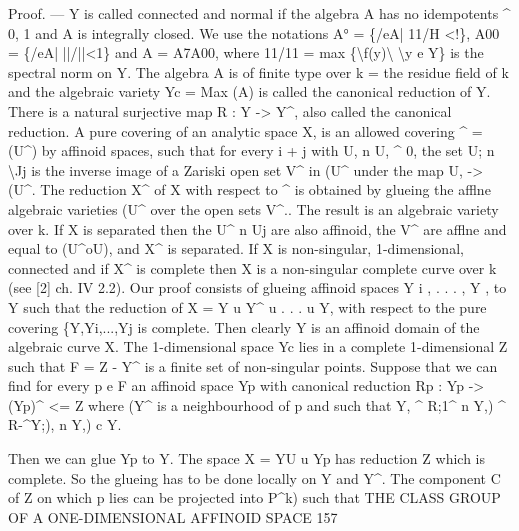 \documentclass[
  10pt,
]{article}
\newenvironment{Shaded}{}{}
\newcommand{\NormalTok}[1]{#1}
\begin{document}
\begin{Shaded}
\begin{Highlighting}[]
\NormalTok{     Proof. — Y is called connected and normal if the algebra A has no}
\NormalTok{idempotents \^{} 0, 1 and A is integrally closed. We use the notations}
\NormalTok{A° = \{/eA| 11/H \textless{}!\}, A00 = \{/eA| ||/||\textless{}1\} and A = A7A00, where}
\NormalTok{11/11 = max \{\textbackslash{}f(y)\textbackslash{} \textbackslash{}y e Y\} is the spectral norm on Y. The algebra A is of}
\NormalTok{finite type over k = the residue field of k and the algebraic variety}
\NormalTok{Yc = Max (A) is called the canonical reduction of Y. There is a natural}
\NormalTok{surjective map R : Y {-}\textgreater{} Y\^{}, also called the canonical reduction. A pure}
\NormalTok{covering of an analytic space X, is an allowed covering \^{} = (U\^{}) by}
\NormalTok{affinoid spaces, such that for every i + j with U, n U, \^{} 0, the set}
\NormalTok{U; n \textbackslash{}Jj is the inverse image of a Zariski open set V\^{} in (U\^{} under the}
\NormalTok{map U, {-}\textgreater{} (U\^{}. The reduction X\^{} of X with respect to \^{} is}
\NormalTok{obtained by glueing the afflne algebraic varieties (U\^{} over the open}
\NormalTok{sets V\^{}.. The result is an algebraic variety over k. If X is separated}
\NormalTok{then the U\^{} n Uj are also affinoid, the V\^{} are afflne and equal to}
\NormalTok{(U\^{}oU), and X\^{} is separated. If X is non{-}singular, 1{-}dimensional,}
\NormalTok{connected and if X\^{} is complete then X is a non{-}singular complete}
\NormalTok{curve over k (see [2] ch. IV 2.2).}
\NormalTok{    Our proof consists of glueing affinoid spaces Y i , . . . , Y , to Y}
\NormalTok{such that the reduction of X = Y u Y\^{} u . . . u Y, with respect}
\NormalTok{to the pure covering \{Y,Yi,...,Yj is complete. Then clearly Y is}
\NormalTok{an affinoid domain of the algebraic curve X. The 1{-}dimensional}
\NormalTok{space Yc lies in a complete 1{-}dimensional Z such that F = Z {-} Y\^{}}
\NormalTok{is a finite set of non{-}singular points. Suppose that we can find for}
\NormalTok{every p e F an affinoid space Yp with canonical reduction}
\NormalTok{Rp : Yp {-}\textgreater{} (Yp)\^{} \textless{}= Z where (Y\^{} is a neighbourhood of p and}
\NormalTok{such that}
\NormalTok{             Y, \^{} R;1\^{} n Y,) \^{} R{-}\^{}Y;), n Y,) c Y.}

\NormalTok{   Then we can glue Yp to Y. The space X = YU u Yp has reduction Z}
\NormalTok{which is complete. So the glueing has to be done locally on Y and Y\^{}. The}
\NormalTok{component C of Z on which p lies can be projected into P\^{}k) such that}
\NormalTok{         THE CLASS GROUP OF A ONE{-}DIMENSIONAL AFFINOID SPACE              157}



\end{Highlighting}
\end{Shaded}
\end{document}
